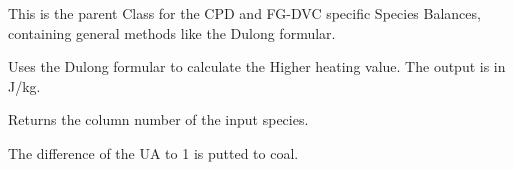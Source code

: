 \documentclass[letterpaper,10pt,english]{sphinxmanual}
\begin{document}
\begin{fulllineitems}
\label{CPDClasses:Compos_and_Energy.SpeciesBalance}
This is the parent Class for the CPD and FG-DVC specific Species Balances, containing general methods like the Dulong formular.

\begin{fulllineitems}
\label{CPDClasses:Compos_and_Energy.SpeciesBalance.Dulong}
Uses the Dulong formular to calculate the Higher heating value. The output is in J/kg.

\end{fulllineitems}


\begin{fulllineitems}
\label{CPDClasses:Compos_and_Energy.SpeciesBalance.SpeciesIndex}
Returns the column number of the input species.

\end{fulllineitems}


\begin{fulllineitems}
\label{CPDClasses:Compos_and_Energy.SpeciesBalance.correctUA}
The difference of the UA to 1 is putted to coal.

\end{fulllineitems}


\end{fulllineitems}

\end{document}
